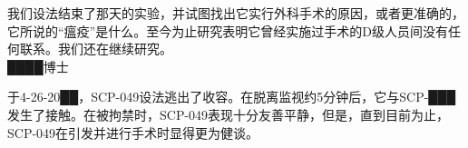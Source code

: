 我们设法结束了那天的实验，并试图找出它实行外科手术的原因，或者更准确的，它所说的“瘟疫”是什么。至今为止研究表明它曾经实施过手术的D级人员间没有任何联系。我们还在继续研究。\\
████博士

于4-26-20██，SCP-049设法逃出了收容。在脱离监视约5分钟后，它与SCP-███发生了接触。在被拘禁时，SCP-049表现十分友善平静，但是，直到目前为止，SCP-049在引发并进行手术时显得更为健谈。

